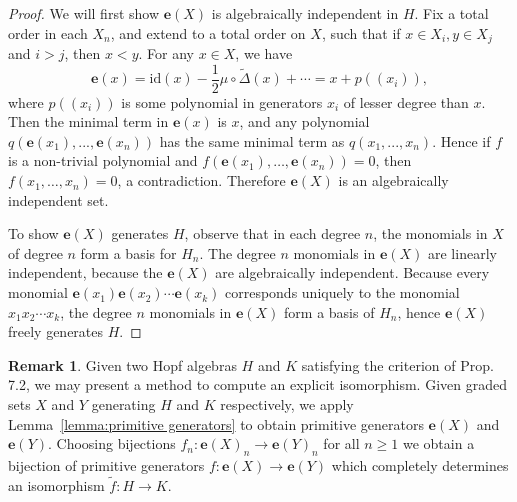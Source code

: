 \documentclass[11pt]{amsart}
\theoremstyle{definition}
\newtheorem{remark}[theorem]{Remark}
\numberwithin{equation}{section}
\begin{document}
\begin{proof}
        We will first show $\mathbf{e}(X)$ is algebraically independent in $H$. Fix a total order in each $X_n$, and extend to a total order on $X$, such that if $x\in X_i, y\in X_j$ and $i>j$, then $x<y$. For any $x\in X$, we have
        \[
        \mathbf{e}(x) = \text{id} (x) - \frac{1}{2}\mu \circ \tilde{\Delta}(x) + \cdots = x + p((x_i)),
        \]
        where $p((x_i))$ is some polynomial in generators $x_i$ of lesser degree than $x$. Then the minimal term in $\mathbf{e}(x)$ is $x$, and any polynomial $q(\mathbf{e}(x_1),...,\mathbf{e}(x_n))$ has the same minimal term as $q(x_1,...,x_n)$. Hence if $f$ is a non-trivial polynomial and $f(\mathbf{e}(x_1), \ldots, \mathbf{e}(x_n)) = 0$, then $f(x_1, \ldots, x_n) = 0$, a contradiction. Therefore $\mathbf{e}(X)$ is an algebraically independent set.
    
        To show $\mathbf{e}(X)$ generates $H$, observe that in each degree $n$, the monomials in $X$ of degree $n$ form a basis for $H_n$. The degree $n$ monomials in $\mathbf{e}(X)$ are linearly independent, because the $\mathbf{e}(X)$ are algebraically independent. Because every monomial $\mathbf{e}(x_1)\mathbf{e}(x_2)\cdots \mathbf{e}(x_k)$ corresponds uniquely to the monomial $x_1x_2 \cdots x_k$, the degree $n$ monomials in $\mathbf{e}(X)$ form a basis of $H_n$, hence $\mathbf{e}(X)$ freely generates $H$.
\end{proof}

\begin{remark}
    Given two Hopf algebras $H$ and $K$ satisfying the criterion of Prop. 7.2, we may present a method to compute an explicit isomorphism. Given graded sets $X$ and $Y$ generating $H$ and $K$ respectively, we apply Lemma~\ref{lemma:primitive generators} to obtain primitive generators $\mathbf{e}(X)$ and $\mathbf{e}(Y)$. Choosing bijections $f_n:\mathbf{e}(X)_n \to \mathbf{e}(Y)_n$ for all $n \geq 1$ we obtain a bijection of primitive generators $f:\mathbf{e}(X) \to \mathbf{e}(Y)$ which completely determines an isomorphism $\tilde{f}:H \to K$.
\end{remark}
\end{document}
